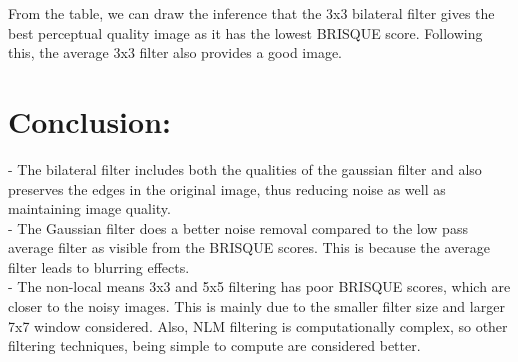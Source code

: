 \documentclass[]{article}
\begin{document}
 	From the table, we can draw the inference that the 3x3 bilateral filter gives the best perceptual quality image as it has the lowest BRISQUE score. Following this, the average 3x3 filter also provides a good image. 
 	
 	\section{Conclusion:}
 	- The bilateral filter includes both the qualities of the gaussian filter and also preserves the edges in the original image, thus reducing noise as well as maintaining image quality. \\
 	- The Gaussian filter does a better noise removal compared to the low pass average filter as visible from the BRISQUE scores. This is because the average filter leads to blurring effects. \\
 	- The non-local means 3x3 and 5x5 filtering has poor BRISQUE scores, which are closer to the noisy images. This is mainly due to the smaller filter size and larger 7x7 window considered. Also, NLM filtering is computationally complex, so other filtering techniques, being simple to compute are considered better. 
 	
 	
%
%

		
\end{document}
